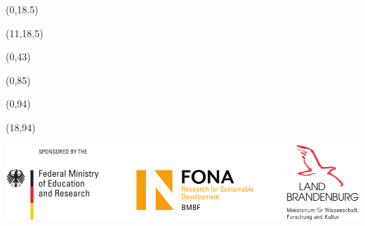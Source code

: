 \documentclass[20pt]{beamer}
\begin{document}
    \begin{frame}

        \begin{textblock}{10.5}(0,18.5)
            
        \end{textblock}

        \begin{textblock}{19}(11,18.5)
            
        \end{textblock}

        \begin{textblock}{30}(0,43)
            
        \end{textblock}

        \begin{textblock}{30}(0,85)
            
        \end{textblock}

        \begin{textblock}{17}(0,94)
            \begin{WhiteBox}
                \vspace{-1cm}
                \begin{block}{}
                    
                    
                \end{block}
            \end{WhiteBox}
        \end{textblock}

        \begin{textblock}{12}(18,94)
            \begin{WhiteBox}
                \vspace{-1cm}
                \begin{block}{}
                    \includegraphics[width=\textwidth]{img/Sponsor_logos}
                \end{block}
            \end{WhiteBox}
        \end{textblock}
    \end{frame}
\end{document}
